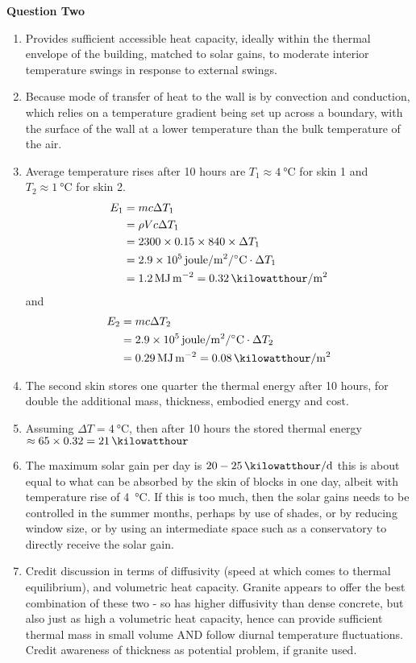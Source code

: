 \documentclass[a4paper,12pt,fleqn]{article}
\begin{document}
\textbf{Question Two}
\begin{enumerate}[label=\alph*)]
\item Provides sufficient accessible heat capacity, ideally within the thermal envelope of the building, matched to solar gains, to moderate interior temperature swings in response to external swings.
\item Because mode of transfer of heat to the wall is by convection and conduction, which relies on a temperature gradient being set up  across a boundary, with the surface of the wall at a lower temperature than the bulk temperature of the air.
\item Average temperature rises after 10 hours are $T_1 \approx \SI{4}{\celsius}$ for skin 1 and $T_2 \approx \SI{1}{\celsius}$ for skin 2.
\begin{align*}
E_1 &=mc\Delta T_1\\
&=\rho V c \Delta T_1\\
&=2300\times 0.15\times 840\times \Delta T_1\\
&=\SI{2.9e5}{joule\per\metre\squared\per\celsius}\cdot \Delta T_1\\
&=\SI{1.2}{\mega\joule\per\metre\squared}=\SI{0.32}{\kilowatthour\per\metre\squared}
\end{align*}
and
\begin{align*}
E_2 &=mc\Delta T_2\\
&=\SI{2.9e5}{joule\per\metre\squared\per\celsius}\cdot \Delta T_2\\
&=\SI{0.29}{\mega\joule\per\metre\squared}=\SI{0.08}{\kilowatthour\per\metre\squared}
\end{align*}
\item The second skin stores one quarter the thermal energy after 10 hours, for double the additional mass, thickness, embodied energy and cost.
\item Assuming $\Delta T=\SI{4}{\celsius}$, then after 10 hours the stored thermal energy $\approx 65\times 0.32=\SI{21}{\kilowatthour}$
\item The maximum solar gain per day is $20-\SI{25}{\kilowatthour\per\day}$ this is about equal to what can be absorbed by the skin of blocks in one day, albeit with temperature rise of \SI{4}{\celsius}. If this is too much, then the solar gains needs to be controlled in the summer months, perhaps by use of shades, or by reducing window size, or by using an intermediate space such as a conservatory to directly receive the solar gain.
\item Credit discussion in terms of diffusivity (speed at which comes to thermal equilibrium), and volumetric heat capacity. Granite appears to offer the best combination of these two - so has higher diffusivity than dense concrete, but also just as high a volumetric heat capacity, hence can provide sufficient thermal mass in small volume AND follow diurnal temperature fluctuations. Credit awareness of thickness as potential problem, if granite used.

\end{enumerate}
\end{document}

